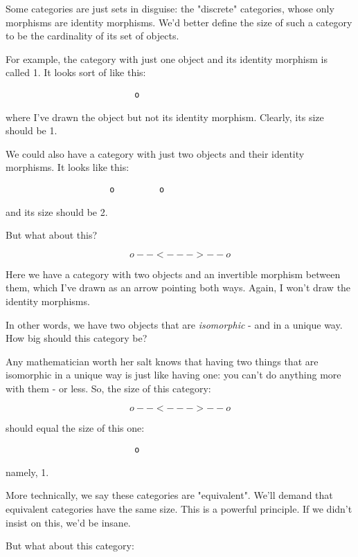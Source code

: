 Some categories are just sets in disguise: the "discrete"
categories, whose only morphisms are identity morphisms.  We'd better
define the size of such a category to be the cardinality of its set of
objects.

For example, the category with just one object and its identity 
morphism is called 1.  It looks sort of like this:

\begin{verbatim}
                          o 
\end{verbatim}
    
where I've drawn the object but not its identity morphism.  Clearly,
its size should be 1. 

We could also have a category with just two objects and their identity
morphisms.  It looks like this:

\begin{verbatim}
                     o         o
\end{verbatim}
    
and its size should be 2.

But what about this? 

$$
                     o--<--->--o
$$
    

Here we have a category with two objects and an invertible morphism 
between them, which I've drawn as an arrow pointing both ways.   Again,
I won't draw the identity morphisms.  

In other words, we have two objects that are \emph{isomorphic} - and
in a unique way.  How big should this category be?

Any mathematician worth her salt knows that having two things that are
isomorphic in a unique way is just like having one: you can't do 
anything more with them - or less.  So, the size of this category:

$$
                     o--<--->--o
$$
    
should equal the size of this one:

\begin{verbatim}
                          o 
\end{verbatim}
    
namely, 1.   

More technically, we say these categories are "equivalent".
We'll demand that equivalent categories have the same size.
This is a powerful principle.  If we didn't insist on this, 
we'd be insane.

But what about this category:

